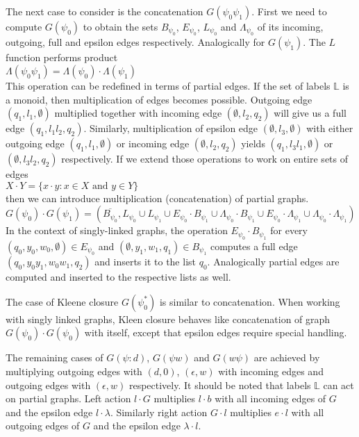 The next case to consider is the concatenation $G(\psi_0 \psi_1)$. 
First we need to compute $G(\psi_0)$ to obtain the sets $B_{\psi_0}$, $E_{\psi_0}$, $L_{\psi_0}$ and $\Lambda_{\psi_0}$ of its incoming, outgoing, full and epsilon edges respectively. 
Analogically for $G(\psi_1)$. The $L$ function performs product \\
$\Lambda(\psi_0\psi_1) =\Lambda(\psi_0) \cdot \Lambda(\psi_1)$ \\
This operation can be redefined in terms of partial edges. If the set of labels $\mathbb{L}$ is a monoid, then multiplication of edges becomes possible.  Outgoing edge $(q_1,l_1,\emptyset)$ multiplied together with incoming edge $(\emptyset,l_2,q_2)$ will give us a full edge $(q_1,l_1 l_2 ,q_2)$. Similarly, multiplication of epsilon edge $(\emptyset,l_3,\emptyset)$ with either outgoing edge $(q_1,l_1,\emptyset)$ or incoming edge $(\emptyset,l_2,q_2)$ yields $(q_1,l_3 l_1,\emptyset)$ or $(\emptyset,l_3 l_2,q_2)$ respectively. If we extend those operations to work on entire sets of edges \\
$X \cdot Y = \{ x\cdot y : x\in X \mbox{ and }y\in Y\}$ \\
then we can introduce multiplication (concatenation) of partial graphs. \\
$G(\psi_0)\cdot G(\psi_1) = (\overline{B_{\psi_0}},L_{\psi_0}\cup L_{\psi_1} \cup E_{\psi_0} \cdot B_{\psi_1} \cup \Lambda_{\psi_0} \cdot B_{\psi_1} \cup E_{\psi_0} \cdot \Lambda_{\psi_1} \cup   \Lambda_{\psi_0} \cdot \Lambda_{\psi_1})$
In the context of singly-linked graphs, the operation $E_{\psi_0} \cdot B_{\psi_1}$ for every $(q_0,y_0,w_0,\emptyset)\in E_{\psi_0}$ and $(\emptyset,y_1,w_1,q_1)\in B_{\psi_1}$ computes a full edge $(q_0,y_0 y_1,w_0 w_1,q_2)$ and inserts it to the list $q_0$. Analogically partial edges are computed and inserted to the respective lists as well.

The case of Kleene closure $G(\psi_0 ^*)$ is similar to concatenation. When working with singly linked graphs, Kleen closure behaves like concatenation of graph $G(\psi_0) \cdot G(\psi_0)$ with itself, except that epsilon edges require special handling. 

The remaining cases of $G(\psi:d)$, $G(\psi w)$ and $G(w \psi)$ are achieved by multiplying outgoing edges with $(d,0)$, $(\epsilon,w)$ with incoming edges and outgoing edges with $(\epsilon,w)$ respectively. It should be noted that labels $\mathbb{L}$ can act on partial graphs. Left action $l \cdot G$ multiplies $l\cdot b$ with all incoming edges of $G$ and the epsilon edge $l \cdot \lambda$. Similarly right action $G \cdot l$  multiplies $e \cdot l$ with all outgoing edges of $G$ and the epsilon edge $ \lambda \cdot l$. 

